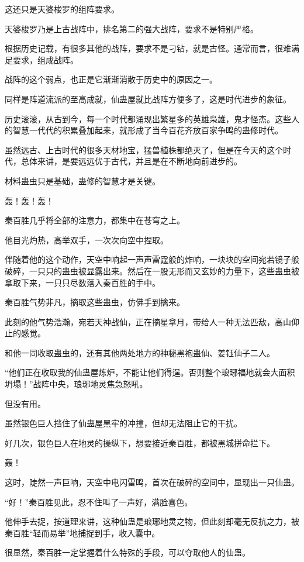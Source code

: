 \begin{this_body}
这还只是天婆梭罗的组阵要求。

天婆梭罗乃是上古战阵中，排名第二的强大战阵，要求不是特别严格。

根据历史记载，有很多其他的战阵，要求不是刁钻，就是古怪。通常而言，很难满足要求，组成战阵。

战阵的这个弱点，也正是它渐渐消散于历史中的原因之一。

同样是阵道流派的至高成就，仙蛊屋就比战阵方便多了，这是时代进步的象征。

历史滚滚，从古到今，每一个时代都涌现出繁星多的英雄枭雄，鬼才怪杰。这些人的智慧一代代的积累叠加起来，就形成了当今百花齐放百家争鸣的蛊修时代。

虽然远古、上古时代的很多天材地宝，猛兽植株都绝灭了，但是在今天的这个时代，总体来讲，是要远远优于古代，并且是在不断地向前进步的。

材料蛊虫只是基础，蛊修的智慧才是关键。

轰！轰！轰！

秦百胜几乎将全部的注意力，都集中在苍穹之上。

他目光灼热，高举双手，一次次向空中捏取。

伴随着他的这个动作，天空中响起一声声雷霆般的炸响，一块块的空间宛若镜子般破碎，一只只的蛊虫被显露出来。然后在一股无形而又玄妙的力量下，这些蛊虫被拿取下来，一只只尽数落入秦百胜的手中。

秦百胜气势非凡，摘取这些蛊虫，仿佛手到擒来。

此刻的他气势浩瀚，宛若天神战仙，正在摘星拿月，带给人一种无法匹敌，高山仰止的感觉。

和他一同收取蛊虫的，还有其他两处地方的神秘黑袍蛊仙、姜钰仙子二人。

“他们正在收取我的仙蛊屋炼炉，不能让他们得逞。否则整个琅琊福地就会大面积坍塌！”战阵中央，琅琊地灵焦急怒吼。

但没有用。

虽然银色巨人挡住了仙蛊屋黑牢的冲撞，但却无法阻止它的干扰。

好几次，银色巨人在地灵的操纵下，想要接近秦百胜，都被黑城拼命拦下。

轰！

这时，陡然一声巨响，天空中电闪雷鸣，首次在破碎的空间中，显现出一只仙蛊。

“好！”秦百胜见此，忍不住叫了一声好，满脸喜色。

他伸手去捉，按道理来讲，这种仙蛊是琅琊地灵之物，但此刻却毫无反抗之力，被秦百胜“轻而易举”地捕捉到手，收入囊中。

很显然，秦百胜一定掌握着什么特殊的手段，可以夺取他人的仙蛊。


\end{this_body}
